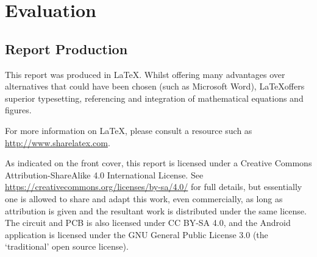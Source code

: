 \chapter{Evaluation}

\section{Report Production}

This report was produced in \LaTeX. Whilst offering many advantages over
alternatives that could have been chosen (such as Microsoft Word), \LaTeX offers
superior typesetting, referencing and integration of mathematical equations and
figures.

For more information on \LaTeX, please consult a resource such as
\url{http://www.sharelatex.com}.

As indicated on the front cover, this report is licensed under a Creative
Commons Attribution-ShareAlike 4.0 International License. See
\url{https://creativecommons.org/licenses/by-sa/4.0/} for full details, but
essentially one is allowed to share and adapt this work, even commercially, as
long as attribution is given and the resultant work is distributed under the
same license. The circuit and PCB is also licensed under CC BY-SA 4.0, and the
Android application is licensed under the GNU General Public License 3.0 (the
`traditional' open source license).
